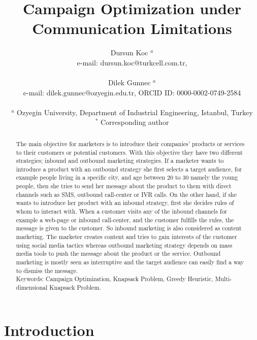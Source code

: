 \documentclass[11pt]{article}
\title{Campaign Optimization under Communication Limitations \\}
\author{Dursun Koc $^{a}$ \\ 
	e-mail: dursun.koc@turkcell.com.tr, \\\\
	Dilek Gunnec $^{a}$ \\ 
	e-mail: dilek.gunnec@ozyegin.edu.tr, ORCID ID: 0000-0002-0749-2584 \\\\
$^{a}$ Ozyegin University, Department of Industrial Engineering, Istanbul, Turkey \\ 
$^{\ast}$ Corresponding author \\ }
\date{}
\begin{document}
\maketitle
\begin{abstract}
The main objective for marketers is to introduce their companies’ products or services to their customers or potential customers. With this objective they have two different strategies; inbound and outbound marketing strategies. If a marketer wants to introduce a product with an outbound strategy she first selects a target audience, for example people living in a specific city, and age between 20 to 30 namely the young people, then she tries to send her message about the product to them with direct channels such as SMS, outbound call-center or IVR calls. On the other hand, if she wants to introduce her product with an inbound strategy, first she decides rules of whom to interact with. When a customer visits any of the inbound channels for example a web-page or inbound call-center, and the customer fulfills the rules, the message is given to the customer. So inbound marketing is also considered as content marketing. The marketer creates content and tries to gain interests of the customer using social media tactics whereas outbound marketing strategy depends on mass media tools to push the message about the product or the service. Outbound marketing is mostly seen as interruptive and the target audience can easily find a way to dismiss the message. \\

Keywords: Campaign Optimization, Knapsack Problem, Greedy Heuristic, Multi-dimensional Knapsack Problem.

\end{abstract}


\newpage

\section{Introduction}
\end{document}
